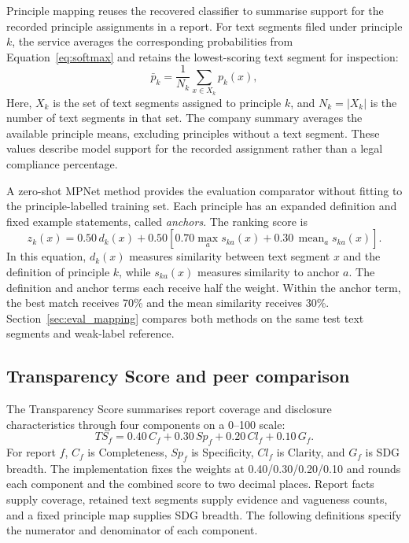Principle mapping reuses the recovered classifier to summarise support for the recorded principle assignments in a report. For text segments filed under principle $k$, the service averages the corresponding probabilities from Equation~\eqref{eq:softmax} and retains the lowest-scoring text segment for inspection:
\begin{equation}
\bar{p}_k=\frac{1}{N_k}\sum_{x\in X_k}p_k(x),
\label{eq:mapmean}
\end{equation}
Here, $X_k$ is the set of text segments assigned to principle $k$, and $N_k=|X_k|$ is the number of text segments in that set. The company summary averages the available principle means, excluding principles without a text segment. These values describe model support for the recorded assignment rather than a legal compliance percentage.

A zero-shot MPNet method provides the evaluation comparator without fitting to the principle-labelled training set. Each principle has an expanded definition and fixed example statements, called \emph{anchors}. The ranking score is
\begin{equation}
z_k(x)=0.50\,d_k(x)+0.50\left[0.70\max_a s_{ka}(x)+0.30\,\operatorname{mean}_a s_{ka}(x)\right].
\label{eq:hybrid}
\end{equation}
In this equation, $d_k(x)$ measures similarity between text segment $x$ and the definition of principle $k$, while $s_{ka}(x)$ measures similarity to anchor $a$. The definition and anchor terms each receive half the weight. Within the anchor term, the best match receives 70\% and the mean similarity receives 30\%. Section~\ref{sec:eval_mapping} compares both methods on the same test text segments and weak-label reference.

\subsection{Transparency Score and peer comparison}
\label{sec:score}

The Transparency Score summarises report coverage and disclosure characteristics through four components on a 0--100 scale:
\begin{equation}
TS_f=0.40\,C_f+0.30\,Sp_f+0.20\,Cl_f+0.10\,G_f.
\label{eq:ts}
\end{equation}
For report $f$, $C_f$ is Completeness, $Sp_f$ is Specificity, $Cl_f$ is Clarity, and $G_f$ is SDG breadth. The implementation fixes the weights at 0.40/0.30/0.20/0.10 and rounds each component and the combined score to two decimal places. Report facts supply coverage, retained text segments supply evidence and vagueness counts, and a fixed principle map supplies SDG breadth. The following definitions specify the numerator and denominator of each component.

